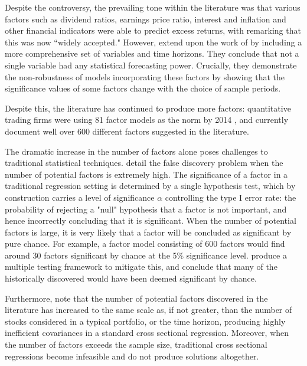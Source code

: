 \documentclass[a4paper, table]{article}
\begin{document}
Despite the controversy, the prevailing tone within the literature was that various factors such as dividend ratios, earnings price ratio, interest and inflation and other financial indicators were able to predict excess returns, with \cite{lettau_consumption_2001} remarking that this was now ``widely accepted." However, \cite{welch_comprehensive_2008} extend upon the work of \cite{goyal_predicting_2003} by including a more comprehensive set of variables and time horizons. They conclude that not a single variable had any statistical forecasting power. Crucially, they demonstrate the non-robustness of models incorporating these factors by showing that the significance values of some factors change with the choice of sample periods.

Despite this, the literature has continued to produce more factors: quantitative trading firms were using 81 factor models as the norm by 2014 \citep{hsu_finding_2014}, and \cite{harvey_census_2019} currently document well over 600 different factors suggested in the literature. 

The dramatic increase in the number of factors alone poses challenges to traditional statistical techniques. \cite{harvey__2016} detail the false discovery problem when the number of potential factors is extremely high. The significance of a factor in a traditional regression setting is determined by a single hypothesis test, which by construction carries a level of significance $\alpha$ controlling the type I error rate: the probability of rejecting a "null" hypothesis that a factor is not important, and hence incorrectly concluding that it is significant. When the number of potential factors is large, it is very likely that a factor will be concluded as significant by pure chance. For example, a factor model consisting of 600 factors would find around 30 factors significant by chance at the 5\% significance level. \cite{harvey__2016} produce a multiple testing framework to mitigate this, and conclude that many of the historically discovered would have been deemed significant by chance.

Furthermore, \cite{feng_taming_2019} note that the number of potential factors discovered in the literature has increased to the same scale as, if not greater, than the number of stocks considered in a typical portfolio, or the time horizon, producing highly inefficient covariances in a standard cross sectional regression. Moreover, when the number of factors exceeds the sample size, traditional cross sectional regressions become infeasible and do not produce solutions altogether. 
\end{document}
